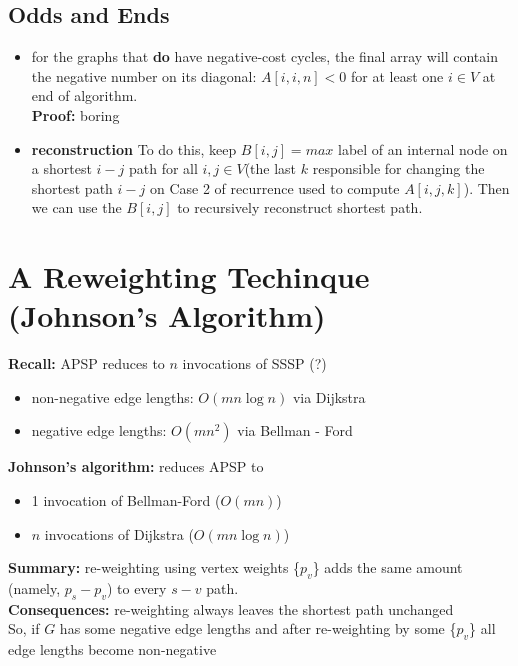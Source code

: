 \documentclass{scrartcl}
\begin{document}
\subsection{Odds and Ends}
\label{sec:15-3-1}
\begin{itemize}
\item for the graphs that {\bf do } have negative-cost cycles, the final array
  will contain the negative number on its diagonal: $A[i, i, n] < 0$ for at
  least one $i \in V$ at end of algorithm.\\
{\bf Proof: } boring 
\item {\bf reconstruction } To do this, keep $B[i, j] = max$ label of an
  internal node on a shortest $i-j$ path for all $i, j \in V$(the last $k$
  responsible for changing the shortest path $i-j$ on Case 2 of recurrence used
  to compute $A[i, j, k]$). Then we can use the $B[i, j]$ to recursively
  reconstruct shortest path.
\end{itemize}

\section{A Reweighting Techinque (Johnson's Algorithm)}
\label{sec:15-4}
{\bf Recall: } APSP reduces to $n$ invocations of SSSP (?)
\begin{itemize}
\item non-negative edge lengths: $O(mn \log n)$ via Dijkstra
\item negative edge lengths: $O(mn^2)$ via Bellman - Ford
\end{itemize}
{\bf Johnson's algorithm: } reduces APSP to
\begin{itemize}
\item 1 invocation of Bellman-Ford ($O(mn)$)
\item $n$ invocations of Dijkstra ($O(mn \log n)$)
\end{itemize}
{\bf Summary: } re-weighting using vertex weights \{$p_v$\} adds the same amount
(namely, $p_s - p_v$) to every $s-v$ path.\\
{\bf Consequences: } re-weighting always leaves the shortest path unchanged\\
So, if $G$ has some negative edge lengths and after re-weighting by some \{$p_v$\}
all edge lengths become non-negative

\end{document}
